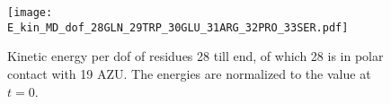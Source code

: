\documentclass[11pt, a4paper]{report}
\begin{document}
\begin{figure}[h]
  \centering
  \texttt{[image: E\_kin\_MD\_dof\_28GLN\_29TRP\_30GLU\_31ARG\_32PRO\_33SER.pdf]}
  \caption{Kinetic energy per dof of residues 28 till end, of which 28 is in polar contact
  with 19 AZU. The energies are normalized to the value at $t=0$.}
  \label{fig:E_kin_MD_dof_28GLN_29TRP_30GLU_31ARG_32PRO_33SER_34GLY}
\end{figure}
\clearpage

{}

\end{document}
